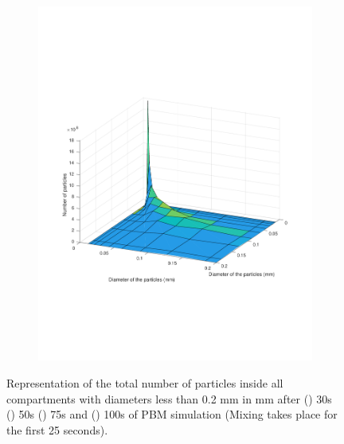 \documentclass[preprint,11pt,authoryear]{elsarticle}
\begin{document}
\begin{figure}
\begin{subfigure}{.5\textwidth}
\includegraphics[scale=0.45]{rslts-PBM_100s_psd.pdf}
\caption{}
\label{fig:100s}
\end{subfigure}
\caption{Representation of the total number of particles inside all compartments with diameters less than 
0.2 mm in mm after () 30s () 50s () 75s and
 () 100s of PBM simulation (Mixing takes place for the first 25 seconds).}
\label{fig:rslts_PBM_d50_plots}
\end{figure}   
\end{document}
